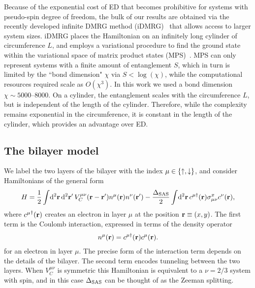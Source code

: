Because of the exponential cost of ED that becomes prohibitive for systems with pseudo-spin degree of freedom, the bulk of our results are obtained via the recently developed infinite DMRG method (iDMRG)~\cite{ZaletelQHdmrg13, ZaletelMixing} that allows access to larger system sizes. 
iDMRG places the Hamiltonian on an infinitely long cylinder of circumference $L$, and employs a variational procedure to find the ground state within the variational space of matrix product states (MPS)~\cite{Fannes1992,Ostlund1995,Rommer1997}. 
MPS can only represent systems with a finite amount of entanglement $S$, which in turn is limited by the ``bond dimension" $\chi$ via $S < \log(\chi)$, while the computational resources required scale as $O(\chi^3)$. In this work we used a bond dimension $\chi \sim 5000\mbox{--}8000$.
On a cylinder, the entanglement scales with the circumference $L$, but is independent of the length of the cylinder. 
Therefore, while the complexity remains exponential in the circumference, it is constant in the length of the cylinder, which provides an advantage over ED. 

\subsection{The bilayer model}
We label the two layers of the bilayer with the index $\mu \in \{\uparrow,\downarrow\}$, and consider  Hamiltonians of the general form
\begin{equation}
	H=\frac{1}{2} \int\! \mathrm{d}^2{\mathbf{r}}\, \mathrm{d}^2{\mathbf{r}}^\prime\, V_C^{\mu\nu}({\mathbf{r}}-{\mathbf{r}}^\prime) n^{\mu}({\mathbf{r}})n^{\nu}({\mathbf{r}}^\prime) 
	- \frac{\Delta_\textrm{SAS}}{2} \int\! \mathrm{d}^2{\mathbf{r}}\, c^{\mu\dagger}({\mathbf{r}}) \sigma^x_{\mu \nu} c^{\nu}({\mathbf{r}}), 
	\label{ham}
\end{equation}
where ${c^{\mu}}^\dagger ({\mathbf{r}})$ creates an electron in layer $\mu$ at the position ${\mathbf{r}}\equiv(x,y)$. The first term is the Coulomb interaction, expressed in terms of the density operator 
\begin{eqnarray}\label{density}
	n^{\mu}({\mathbf{r}})=c^{\mu\dagger} ({\mathbf{r}}) c^{\mu}({\mathbf{r}}).
\end{eqnarray}
for an electron in layer $\mu$. The precise form of the interaction term depends on the details of the bilayer. The second term encodes tunneling between the two layers.
When $V_C^{\mu\nu}$ is  symmetric this Hamiltonian is equivalent to a $\nu=2/3$ system with spin, and in this case $\Delta_\textrm{SAS}$ can be thought of as the Zeeman splitting.


